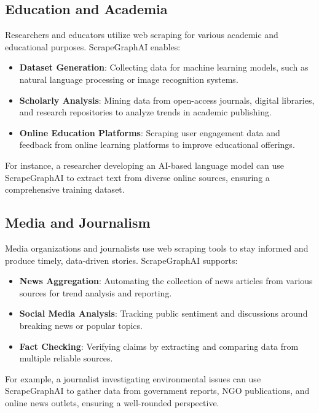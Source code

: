 \subsection{Education and Academia}
Researchers and educators utilize web scraping for various academic and educational purposes. ScrapeGraphAI enables:
\begin{itemize}
    \item \textbf{Dataset Generation}: Collecting data for machine learning models, such as natural language processing or image recognition systems.
    \item \textbf{Scholarly Analysis}: Mining data from open-access journals, digital libraries, and research repositories to analyze trends in academic publishing.
    \item \textbf{Online Education Platforms}: Scraping user engagement data and feedback from online learning platforms to improve educational offerings.
\end{itemize}
For instance, a researcher developing an AI-based language model can use ScrapeGraphAI to extract text from diverse online sources, ensuring a comprehensive training dataset.

\subsection{Media and Journalism}
Media organizations and journalists use web scraping tools to stay informed and produce timely, data-driven stories. ScrapeGraphAI supports:
\begin{itemize}
    \item \textbf{News Aggregation}: Automating the collection of news articles from various sources for trend analysis and reporting.
    \item \textbf{Social Media Analysis}: Tracking public sentiment and discussions around breaking news or popular topics.
    \item \textbf{Fact Checking}: Verifying claims by extracting and comparing data from multiple reliable sources.
\end{itemize}
For example, a journalist investigating environmental issues can use ScrapeGraphAI to gather data from government reports, NGO publications, and online news outlets, ensuring a well-rounded perspective.

